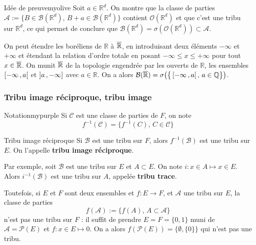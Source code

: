     \begin{demo}{Idée de preuve}{myolive}
        Soit $a \in \mathbb{R}^d$. On montre que la classe de parties $\mathcal{A} := \{ B \in \mathcal{B}(\mathbb{R}^d), \, B + a \in \mathcal{B}(\mathbb{R}^d) \}$ contient $\mathcal{O}(\mathbb{R}^d)$ et que c’est une tribu sur $\mathbb{R}^d$, ce qui permet de conclure que $\mathcal{B}(\mathbb{R}^d) = \sigma(\mathcal{O}(\mathbb{R}^d)) \subset \mathcal{A}$.
    \end{demo}

    On peut étendre les boréliens de $\mathbb{R}$ à $\overline{\mathbb{R}}$, en introduisant deux éléments $-\infty$ et $+\infty$ et étendant la relation d’ordre totale en posant $-\infty \leq x \leq +\infty$ pour tout $x \in \overline{\mathbb{R}}$. On munit $\overline{\mathbb{R}}$ de la topologie engendrée par les ouverts de $\mathbb{R}$, les ensembles $\left[ -\infty \, , a \right[$ et $\left] a \, , -\infty \right]$ avec $a \in \mathbb{R}$. On a alors $\mathcal{B}(\overline{\mathbb{R}}) = \sigma \big( \big\{ \left[ -\infty \, , a \right[, \, a \in \mathbb{Q} \big\} \big)$.

    \subsubsection{Tribu image réciproque, tribu image}

    \begin{omed}{Notation}{mypurple}
        Si $\mathcal{C}$ est une classe de parties de $F$, on note 
        \[ f^{-1} (\mathcal{C}) = \{ f^{-1}(C), \, C \in \mathcal{C}\} \]   
    \end{omed}

    \begin{defitheo}{Tribu image réciproque}{}
        Si $\mathcal{B}$ est une tribu sur $F$, alors $f^{-1}(\mathcal{B})$ est une tribu sur $E$. On l’appelle \textbf{tribu image réciproque}.
    \end{defitheo}

    Par exemple, soit $\mathcal{B}$ est une tribu sur $E$ et $A \subset E$. On note $i : x \in A \mapsto x \in E$. Alors $i^{-1}(\mathcal{B})$ est une tribu sur $A$, appelée \textbf{tribu trace}.

    Toutefois, si $E$ et $F$ sont deux ensembles et $f : E \to F$, et $\mathcal{A}$ une tribu sur $E$, la classe de parties 
    \[ f(\mathcal{A}) := \{ f(A), \, A \subset \mathcal{A}\} \] 
    n’est pas une tribu sur $F$ : il suffit de prendre $E = F = \{0,1\}$ muni de $\mathcal{A} = \mathcal{P}(E)$ et $f : x \in E \mapsto 0$. On a alors $f(\mathcal{P}(E)) = \{\emptyset, \{0\}\}$ qui n’est pas une tribu.
    
